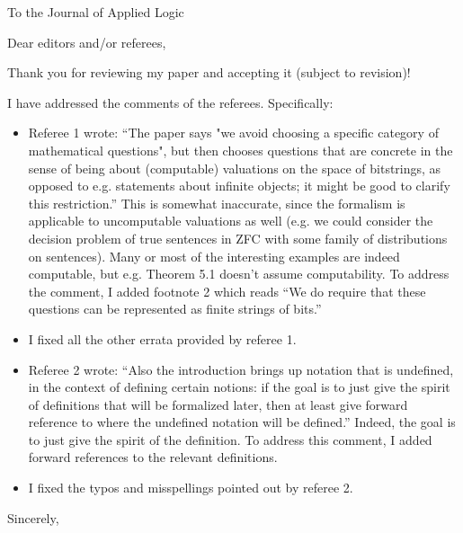 \documentclass{letter}
\begin{document}


\address{}

\begin{letter}{To the Journal of Applied Logic} %

\opening{Dear editors and/or referees,}

Thank you for reviewing my paper and accepting it (subject to revision)!

I have addressed the comments of the referees. Specifically:

\begin{itemize}
\item 
Referee 1 wrote: \enquote{The paper says "we avoid choosing a specific category of mathematical 
questions", but then chooses questions that are concrete in the sense of 
being about (computable) valuations on the space of bitstrings, as 
opposed to e.g. statements about infinite objects; it might be good to 
clarify this restriction.} This is somewhat inaccurate, since the formalism is applicable to uncomputable valuations as well (e.g. we could consider the decision problem of true sentences in ZFC with some family of distributions on sentences). Many or most of the interesting examples are indeed computable, but e.g. Theorem 5.1 doesn't assume computability. To address the comment, I added footnote 2 which reads \enquote{We do require that these questions can be represented as finite strings of bits.}
\item I fixed all the other errata provided by referee 1.
\item Referee 2 wrote: \enquote{Also the introduction brings up notation that is 
undefined, in the context of defining certain notions: if the goal is to 
just give the spirit of definitions that will be formalized later, then 
at least give forward reference to where the undefined notation will be 
defined.} Indeed, the goal is to just give the spirit of the definition. To address this comment, I added forward references to the relevant definitions.
\item I fixed the typos and misspellings pointed out by referee 2.
\end{itemize}

\signature{Vanessa Kosoy}
\closing{Sincerely,}




\end{letter}
\end{document}
